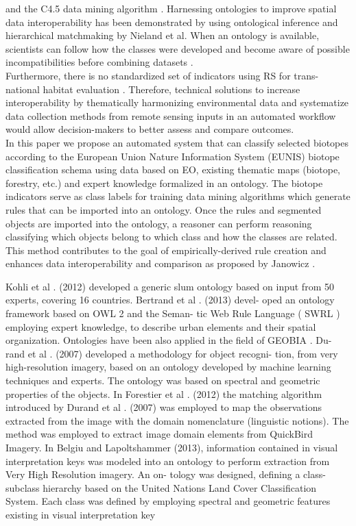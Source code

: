 \documentclass[authoryear, review,12pt,number]{elsarticle}
\begin{document}
\citep{Forestier2012470} and the C4.5 data mining algorithm
\citep{Sheeren2006ML}. Harnessing ontologies to improve spatial data interoperability has been
demonstrated by using ontological inference and hierarchical matchmaking
by Nieland et al. \citep{Nieland2015} 
When an ontology is available, scientists can follow how the classes
were developed and become aware of possible incompatibilities before combining
datasets \citep{Janowicz2012}.
\\
Furthermore, there is no standardized set of indicators using RS for
trans-national habitat evaluation \citep{Lucas2015}. Therefore, technical
solutions to increase interoperability by thematically harmonizing
environmental data and systematize data collection methods from remote sensing
inputs in an automated workflow would allow decision-makers to better assess and compare outcomes. 
\\
In this paper we propose an automated system that can classify selected
biotopes according to the European Union Nature Information System (EUNIS)
biotope classification schema using data based on EO, existing thematic maps
(biotope, forestry, etc.) and expert knowledge formalized in an ontology.  The
biotope indicators serve as class labels for training data mining algorithms
which generate rules that can be imported into an ontology. Once the rules and
segmented objects are imported into the ontology, a reasoner can perform
reasoning classifying which objects belong to which class and how the classes
are related. This method contributes to the goal of empirically-derived rule
creation and enhances data interoperability and comparison as proposed by
Janowicz \citep{Janowicz2012}.

Kohli et al .
(2012) developed a generic slum ontology based on input from 50 experts,
covering 16 countries. Bertrand et al . (2013) devel- oped an ontology framework
based on OWL 2 and the Seman- tic Web Rule Language ( SWRL ) employing expert
knowledge, to describe urban elements and their spatial organization.
Ontologies have been also applied in the field of GEOBIA . Du- rand et al .
(2007) developed a methodology for object recogni- tion, from very
high-resolution imagery, based on an ontology developed by machine learning
techniques and experts. The ontology was based on spectral and geometric
properties of the objects. In Forestier et al . (2012) the matching algorithm
introduced by Durand et al . (2007) was employed to map the observations
extracted from the image with the domain nomenclature (linguistic notions). The
method was employed to extract image domain elements from QuickBird Imagery.
In Belgiu and Lapoltshammer (2013), information contained in visual
interpretation keys was modeled into an ontology to perform extraction from Very
High Resolution imagery. An on- tology was designed, defining a class- subclass
hierarchy based on the United Nations Land Cover Classification System. Each
class was defined by employing spectral and geometric features existing in
visual interpretation key
\end{document}
